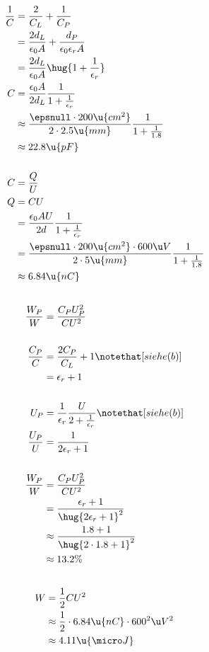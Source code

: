 \documentclass[11pt]{article}
\begin{document}
\subsection{}
\begin{align*}
    \frac1C &=\frac{2}{C_L} + \frac{1}{C_P}\\
    &= \frac{2d_L}{\epsilon_0 A} + \frac{d_P}{\epsilon_0\epsilon_r A}\\
    &= \frac{2d_L}{\epsilon_0 A}\hug{1+ \frac{1}{\epsilon_r}}\\
    C &= \frac{\epsilon_0 A}{2d_L}\frac{1}{1 + \frac{1}{\epsilon_r}}\\
    &\approx \frac{\epsnull\cdot 200\u{cm^2}}{2\cdot 2.5\u{mm}} \frac{1}{1 + \frac{1}{1.8}}\\
    &\approx 22.8 \u{pF} \\
    \\
    C &= \frac{Q}{U}\\
    Q &= CU\\
    &= \frac{\epsilon_0 A U}{2d}\frac{1}{1 + \frac{1}{\epsilon_r}}\\
    &= \frac{\epsnull\cdot 200\u{cm^2}\cdot 600 \u V}{2\cdot 5\u{mm}} \frac{1}{1 + \frac{1}{1.8}}\\
    &\approx 6.84\u{nC}
\end{align*}

\subsection{}
\begin{align*}
    \frac{W_P}{W} &=  \frac{C_P U_P^2}{C U^2}\\
    \\
    \frac{C_P}C &=\frac{2C_P}{C_L} + 1\notethat[siehe (b)]\\
    &= \epsilon_r+1\\
    \\
    U_P &= \frac{1}{\epsilon_r}\frac{U}{{2+ \frac1{\epsilon_r}}}\notethat[siehe (b)]\\
    \frac{U_P}U &= \frac{1}{2\epsilon_r+ 1}\\
    \\
    \frac{W_P}{W} &=  \frac{C_P U_P^2}{C U^2}\\
    &= \frac{\epsilon_r+1}{\hug{2\epsilon_r+ 1}^2}\\
    &\approx \frac{1.8+1}{\hug{2\cdot1.8+ 1}^2}\\
    &\approx 13.2 \%
\end{align*}

\subsection{}
\begin{align*}
    W &= \frac{1}{2}CU^2\\
    &\approx \frac{1}{2} \cdot 6.84\u{nC} \cdot 600^2\u V^2\\
    &\approx 4.11\u{\micro J}
\end{align*}
\end{document}
